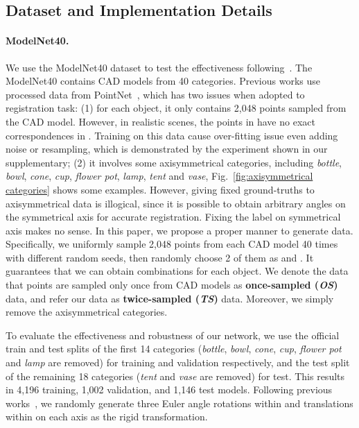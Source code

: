 \documentclass[10pt,twocolumn,letterpaper]{article}
\begin{document}
\subsection{Dataset and Implementation Details} \label{sec:4.1}
\paragraph{ModelNet40.}
We use the ModelNet40 dataset to test the effectiveness following~\cite{aoki2019pointnetlk, wang2019deep, sarode2019pcrnet, wang2019prnet, huang2020feature, yew2020-RPMNet, idam}. The ModelNet40 contains CAD models from 40 categories. Previous works use processed data from PointNet~\cite{qi2017pointnet}, which has two issues when adopted to registration task: (1) for each object, it only contains 2,048 points sampled from the CAD model. However, in realistic scenes, the points in  have no exact correspondences in . Training on this data cause over-fitting issue even adding noise or resampling, which is demonstrated by the experiment shown in our supplementary; (2) it involves some axisymmetrical categories, including \emph{bottle}, \emph{bowl}, \emph{cone}, \emph{cup}, \emph{flower pot}, \emph{lamp}, \emph{tent} and \emph{vase}, Fig.~\ref{fig:axisymmetrical categories} shows some examples. However, giving fixed ground-truths to axisymmetrical data is illogical, since it is possible to obtain arbitrary angles on the symmetrical axis for accurate registration. Fixing the label on symmetrical axis makes no sense. 
In this paper, we propose a proper manner to generate data. Specifically, we uniformly sample 2,048 points from each CAD model 40 times with different random seeds, then randomly choose 2 of them as  and . It guarantees that we can obtain  combinations for each object. We denote the data that points are sampled only once from CAD models as \textbf{once-sampled (\emph{OS})} data, and refer our data as \textbf{twice-sampled (\emph{TS})} data. Moreover, we simply remove the axisymmetrical categories.

To evaluate the effectiveness and robustness of our network, we use the official train and test splits of the first 14 categories (\emph{bottle}, \emph{bowl}, \emph{cone}, \emph{cup}, \emph{flower pot} and \emph{lamp} are removed) for training and validation respectively, and the test split of the remaining 18 categories (\emph{tent} and \emph{vase} are removed) for test. This results in 4,196 training, 1,002 validation, and 1,146 test models. Following previous works~\cite{wang2019deep, wang2019prnet, huang2020feature, yew2020-RPMNet, idam}, we randomly generate three Euler angle rotations within  and translations within  on each axis as the rigid transformation.
\end{document}
